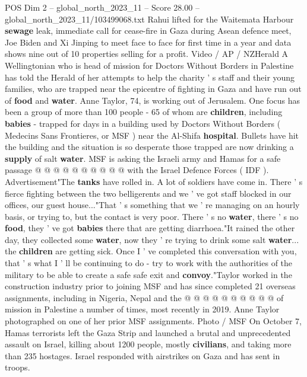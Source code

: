 \begin{textsample}{POS Dim 2 – global\_north\_2023\_11 – Score 28.00 – global\_north\_2023\_11/103499068.txt}  \label{ex:f2_pos_234}
Rahui lifted for the Waitemata Harbour \textbf{sewage} leak, immediate call for cease-fire in Gaza during Asean defence meet, Joe Biden and Xi Jinping to meet face to face for first time in a year and data shows nine out of 10 properties selling for a profit.
Video / AP / NZHerald A Wellingtonian who is head of mission for Doctors Without Borders in Palestine has told the Herald of her attempts to help the charity ' s staff and their young families, who are trapped near the epicentre of fighting in Gaza and have run out of \textbf{food} and \textbf{water}.
Anne Taylor, 74, is working out of Jerusalem.
One focus has been a group of more than 100 people - 65 of whom are \textbf{children}, including \textbf{babies} - trapped for days in a building used by Doctors Without Borders ( Medecins Sans Frontieres, or MSF ) near the Al-Shifa \textbf{hospital}.
Bullets have hit the building and the situation is so desperate those trapped are now drinking a \textbf{supply} of salt \textbf{water}.
MSF is asking the Israeli army and Hamas for a safe passage @ @ @ @ @ @ @ @ @ @ with the Israel Defence Forces ( IDF ).
Advertisement"The \textbf{tanks} have rolled in.
A lot of soldiers have come in.
There ' s fierce fighting between the two belligerents and we ' ve got staff blocked in our offices, our guest house..."That ' s something that we ' re managing on an hourly basis, or trying to, but the contact is very poor.
There ' s no \textbf{water}, there ' s no \textbf{food}, they ' ve got \textbf{babies} there that are getting diarrhoea."It rained the other day, they collected some \textbf{water}, now they ' re trying to drink some salt \textbf{water}... the \textbf{children} are getting sick.
Once I ' ve completed this conversation with you, that ' s what I ' ll be continuing to do - try to work with the authorities of the military to be able to create a safe safe exit and \textbf{convoy}."Taylor worked in the construction industry prior to joining MSF and has since completed 21 overseas assignments, including in Nigeria, Nepal and the @ @ @ @ @ @ @ @ @ @ of mission in Palestine a number of times, most recently in 2019.
Anne Taylor photographed on one of her prior MSF assignments.
Photo / MSF On October 7, Hamas terrorists left the Gaza Strip and launched a brutal and unprecedented assault on Israel, killing about 1200 people, mostly \textbf{civilians}, and taking more than 235 hostages.
Israel responded with airstrikes on Gaza and has sent in troops.

\end{textsample}
